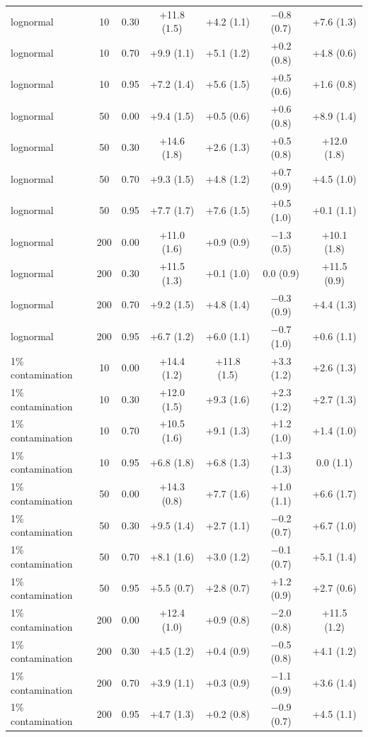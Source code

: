 {\begin{longtable}{lcccccc}
lognormal & 10 & 0.30 & +11.8 (1.5) & +4.2 (1.1) & $-$0.8 (0.7) & +7.6 (1.3) \\
lognormal & 10 & 0.70 & +9.9 (1.1) & +5.1 (1.2) & +0.2 (0.8) & +4.8 (0.6) \\
lognormal & 10 & 0.95 & +7.2 (1.4) & +5.6 (1.5) & +0.5 (0.6) & +1.6 (0.8) \\
lognormal & 50 & 0.00 & +9.4 (1.5) & +0.5 (0.6) & +0.6 (0.8) & +8.9 (1.4) \\
lognormal & 50 & 0.30 & +14.6 (1.8) & +2.6 (1.3) & +0.5 (0.8) & +12.0 (1.8) \\
lognormal & 50 & 0.70 & +9.3 (1.5) & +4.8 (1.2) & +0.7 (0.9) & +4.5 (1.0) \\
lognormal & 50 & 0.95 & +7.7 (1.7) & +7.6 (1.5) & +0.5 (1.0) & +0.1 (1.1) \\
lognormal & 200 & 0.00 & +11.0 (1.6) & +0.9 (0.9) & $-$1.3 (0.5) & +10.1 (1.8) \\
lognormal & 200 & 0.30 & +11.5 (1.3) & +0.1 (1.0) & 0.0 (0.9) & +11.5 (0.9) \\
lognormal & 200 & 0.70 & +9.2 (1.5) & +4.8 (1.4) & $-$0.3 (0.9) & +4.4 (1.3) \\
lognormal & 200 & 0.95 & +6.7 (1.2) & +6.0 (1.1) & $-$0.7 (1.0) & +0.6 (1.1) \\
1\% contamination & 10 & 0.00 & +14.4 (1.2) & +11.8 (1.5) & +3.3 (1.2) & +2.6 (1.3) \\
1\% contamination & 10 & 0.30 & +12.0 (1.5) & +9.3 (1.6) & +2.3 (1.2) & +2.7 (1.3) \\
1\% contamination & 10 & 0.70 & +10.5 (1.6) & +9.1 (1.3) & +1.2 (1.0) & +1.4 (1.0) \\
1\% contamination & 10 & 0.95 & +6.8 (1.8) & +6.8 (1.3) & +1.3 (1.3) & 0.0 (1.1) \\
1\% contamination & 50 & 0.00 & +14.3 (0.8) & +7.7 (1.6) & +1.0 (1.1) & +6.6 (1.7) \\
1\% contamination & 50 & 0.30 & +9.5 (1.4) & +2.7 (1.1) & $-$0.2 (0.7) & +6.7 (1.0) \\
1\% contamination & 50 & 0.70 & +8.1 (1.6) & +3.0 (1.2) & $-$0.1 (0.7) & +5.1 (1.4) \\
1\% contamination & 50 & 0.95 & +5.5 (0.7) & +2.8 (0.7) & +1.2 (0.9) & +2.7 (0.6) \\
1\% contamination & 200 & 0.00 & +12.4 (1.0) & +0.9 (0.8) & $-$2.0 (0.8) & +11.5 (1.2) \\
1\% contamination & 200 & 0.30 & +4.5 (1.2) & +0.4 (0.9) & $-$0.5 (0.8) & +4.1 (1.2) \\
1\% contamination & 200 & 0.70 & +3.9 (1.1) & +0.3 (0.9) & $-$1.1 (0.9) & +3.6 (1.4) \\
1\% contamination & 200 & 0.95 & +4.7 (1.3) & +0.2 (0.8) & $-$0.9 (0.7) & +4.5 (1.1) \\
\end{longtable}
}

